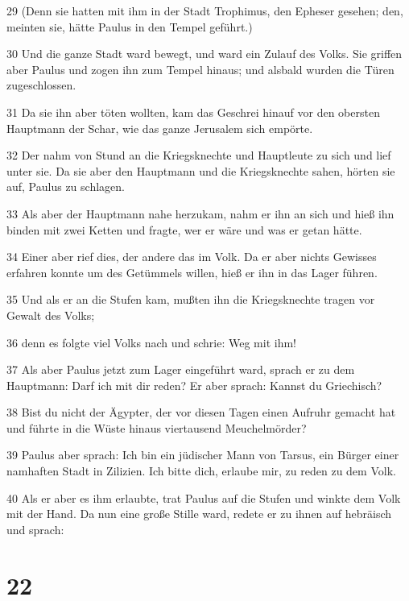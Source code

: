 \par 29 (Denn sie hatten mit ihm in der Stadt Trophimus, den Epheser gesehen; den, meinten sie, hätte Paulus in den Tempel geführt.)
\par 30 Und die ganze Stadt ward bewegt, und ward ein Zulauf des Volks. Sie griffen aber Paulus und zogen ihn zum Tempel hinaus; und alsbald wurden die Türen zugeschlossen.
\par 31 Da sie ihn aber töten wollten, kam das Geschrei hinauf vor den obersten Hauptmann der Schar, wie das ganze Jerusalem sich empörte.
\par 32 Der nahm von Stund an die Kriegsknechte und Hauptleute zu sich und lief unter sie. Da sie aber den Hauptmann und die Kriegsknechte sahen, hörten sie auf, Paulus zu schlagen.
\par 33 Als aber der Hauptmann nahe herzukam, nahm er ihn an sich und hieß ihn binden mit zwei Ketten und fragte, wer er wäre und was er getan hätte.
\par 34 Einer aber rief dies, der andere das im Volk. Da er aber nichts Gewisses erfahren konnte um des Getümmels willen, hieß er ihn in das Lager führen.
\par 35 Und als er an die Stufen kam, mußten ihn die Kriegsknechte tragen vor Gewalt des Volks;
\par 36 denn es folgte viel Volks nach und schrie: Weg mit ihm!
\par 37 Als aber Paulus jetzt zum Lager eingeführt ward, sprach er zu dem Hauptmann: Darf ich mit dir reden? Er aber sprach: Kannst du Griechisch?
\par 38 Bist du nicht der Ägypter, der vor diesen Tagen einen Aufruhr gemacht hat und führte in die Wüste hinaus viertausend Meuchelmörder?
\par 39 Paulus aber sprach: Ich bin ein jüdischer Mann von Tarsus, ein Bürger einer namhaften Stadt in Zilizien. Ich bitte dich, erlaube mir, zu reden zu dem Volk.
\par 40 Als er aber es ihm erlaubte, trat Paulus auf die Stufen und winkte dem Volk mit der Hand. Da nun eine große Stille ward, redete er zu ihnen auf hebräisch und sprach:

\chapter{22}

